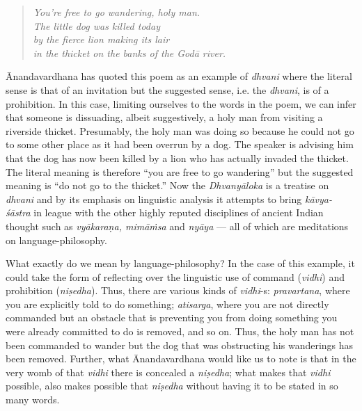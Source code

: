 \begin{quote}
\textsl{You’re free to go wandering, holy man.}\\
\textsl{The little dog was killed today}\\
\textsl{by the fierce lion making its lair}\\
\textsl{in the thicket on the banks of the Godā river.}
\end{quote}

Ānandavardhana has quoted this poem as an example of \textsl{dhvani} where the literal sense is that of an invitation but the suggested sense, i.e. the \textsl{dhvani}, is of a prohibition. In this case, limiting ourselves to the words in the poem, we can infer that someone is dissuading, albeit suggestively, a holy man from visiting a riverside thicket. Presumably, the holy man was doing so because he could not go to some other place as it had been overrun by a dog. The speaker is advising him that the dog has now been killed by a lion who has actually invaded the thicket. The literal meaning is therefore ``you are free to go wandering'' but the suggested meaning is ``do not go to the thicket.'' Now the \textsl{Dhvanyāloka} is a treatise on \textsl{dhvani} and by its emphasis on linguistic analysis it attempts to bring \textsl{kāvya-śāstra} in league with the other highly reputed disciplines of ancient Indian thought such as \textsl{vyākaraṇa, mimāṁsa} and \textsl{nyāya} --- all of which are meditations on language-philosophy.

What exactly do we mean by language-philosophy? In the case of this example, it could take the form of reflecting over the linguistic use of command (\textsl{vidhi}) and prohibition (\textsl{niṣedha}). Thus, there are various kinds of \textsl{vidhi}-s: \textsl{pravartana}, where you are explicitly told to do something; \textsl{atisarga}, where you are not directly commanded but an obstacle that is preventing you from doing something you were already committed to do is removed, and so on. Thus, the holy man has not been commanded to wander but the dog that was obstructing his wanderings has been removed. Further, what Ānandavardhana would like us to note is that in the very womb of that \textsl{vidhi} there is concealed a \textsl{niṣedha}; what makes that \textsl{vidhi} possible, also makes possible that \textsl{niṣedha} without having it to be stated in so many words.                

